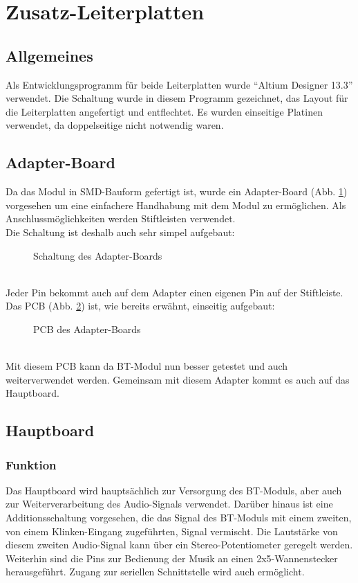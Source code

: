 \section{Zusatz-Leiterplatten}
\subsection{Allgemeines}
Als Entwicklungsprogramm für beide Leiterplatten wurde  \enquote{Altium Designer 13.3} verwendet. Die Schaltung wurde in diesem Programm gezeichnet, das Layout für die Leiterplatten angefertigt und entflechtet. Es wurden einseitige Platinen verwendet, da doppelseitige nicht notwendig waren.


\subsection{Adapter-Board}
Da das Modul in SMD-Bauform gefertigt ist, wurde ein Adapter-Board (Abb. \ref{fig:abb3.1}) vorgesehen um eine einfachere Handhabung mit dem Modul zu ermöglichen. Als Anschlussmöglichkeiten werden Stiftleisten verwendet.\\
Die Schaltung ist deshalb auch sehr simpel aufgebaut:
\begin{figure} [h]
	\centering
	\caption{Schaltung des Adapter-Boards}\label {fig:abb3.1}
\end{figure} \\
Jeder Pin bekommt auch auf dem Adapter einen eigenen Pin auf der Stiftleiste.
\newpage
Das PCB (Abb. \ref{fig:abb3.2}) ist, wie bereits erwähnt, einseitig aufgebaut:
\begin{figure} [h]
	\centering
	\caption{PCB des Adapter-Boards}\label {fig:abb3.2}
\end{figure} \\
Mit diesem PCB kann da BT-Modul nun besser getestet und auch weiterverwendet werden. Gemeinsam mit diesem Adapter kommt es auch auf das Hauptboard.
\newpage


\subsection{Hauptboard}
\subsubsection{Funktion}
Das Hauptboard wird hauptsächlich zur Versorgung des BT-Moduls, aber auch zur Weiterverarbeitung des Audio-Signals verwendet. Darüber hinaus ist eine Additionsschaltung vorgesehen, die das Signal des BT-Moduls mit einem zweiten, von einem Klinken-Eingang zugeführten, Signal vermischt. Die Lautstärke von diesem zweiten Audio-Signal kann über ein Stereo-Potentiometer geregelt werden. \\
Weiterhin sind die Pins zur Bedienung der Musik an einen 2x5-Wannenstecker herausgeführt. Zugang zur seriellen Schnittstelle wird auch ermöglicht.


